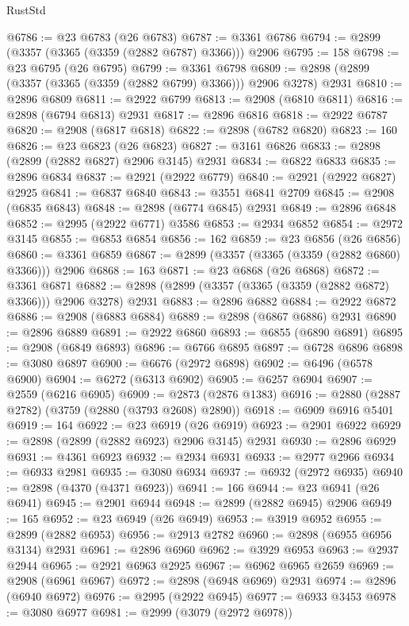 \begin{lexlean}{RustStd}
\begin{coremodule}
@6786 := @23 @6783 (@26 @6783)
@6787 := @3361 @6786
@6794 := @2899 (@3357 (@3365 (@3359 (@2882 @6787) @3366))) @2906
@6795 := 158
@6798 := @23 @6795 (@26 @6795)
@6799 := @3361 @6798
@6809 := @2898 (@2899 (@3357 (@3365 (@3359 (@2882 @6799) @3366))) @2906 @3278) @2931
@6810 := @2896 @6809
@6811 := @2922 @6799
@6813 := @2908 (@6810 @6811)
@6816 := @2898 (@6794 @6813) @2931
@6817 := @2896 @6816
@6818 := @2922 @6787
@6820 := @2908 (@6817 @6818)
@6822 := @2898 (@6782 @6820)
@6823 := 160
@6826 := @23 @6823 (@26 @6823)
@6827 := @3161 @6826
@6833 := @2898 (@2899 (@2882 @6827) @2906 @3145) @2931
@6834 := @6822 @6833
@6835 := @2896 @6834
@6837 := @2921 (@2922 @6779)
@6840 := @2921 (@2922 @6827) @2925
@6841 := @6837 @6840
@6843 := @3551 @6841 @2709
@6845 := @2908 (@6835 @6843)
@6848 := @2898 (@6774 @6845) @2931
@6849 := @2896 @6848
@6852 := @2995 (@2922 @6771) @3586
@6853 := @2934 @6852
@6854 := @2972 @3145
@6855 := @6853 @6854
@6856 := 162
@6859 := @23 @6856 (@26 @6856)
@6860 := @3361 @6859
@6867 := @2899 (@3357 (@3365 (@3359 (@2882 @6860) @3366))) @2906
@6868 := 163
@6871 := @23 @6868 (@26 @6868)
@6872 := @3361 @6871
@6882 := @2898 (@2899 (@3357 (@3365 (@3359 (@2882 @6872) @3366))) @2906 @3278) @2931
@6883 := @2896 @6882
@6884 := @2922 @6872
@6886 := @2908 (@6883 @6884)
@6889 := @2898 (@6867 @6886) @2931
@6890 := @2896 @6889
@6891 := @2922 @6860
@6893 := @6855 (@6890 @6891)
@6895 := @2908 (@6849 @6893)
@6896 := @6766 @6895
@6897 := @6728 @6896
@6898 := @3080 @6897
@6900 := @6676 (@2972 @6898)
@6902 := @6496 (@6578 @6900)
@6904 := @6272 (@6313 @6902)
@6905 := @6257 @6904
@6907 := @2559 (@6216 @6905)
@6909 := @2873 (@2876 @1383)
@6916 := @2880 (@2887 @2782) (@3759 (@2880 (@3793 @2608) @2890))
@6918 := @6909 @6916 @5401
@6919 := 164
@6922 := @23 @6919 (@26 @6919)
@6923 := @2901 @6922
@6929 := @2898 (@2899 (@2882 @6923) @2906 @3145) @2931
@6930 := @2896 @6929
@6931 := @4361 @6923
@6932 := @2934 @6931
@6933 := @2977 @2966
@6934 := @6933 @2981
@6935 := @3080 @6934
@6937 := @6932 (@2972 @6935)
@6940 := @2898 (@4370 (@4371 @6923))
@6941 := 166
@6944 := @23 @6941 (@26 @6941)
@6945 := @2901 @6944
@6948 := @2899 (@2882 @6945) @2906
@6949 := 165
@6952 := @23 @6949 (@26 @6949)
@6953 := @3919 @6952
@6955 := @2899 (@2882 @6953)
@6956 := @2913 @2782
@6960 := @2898 (@6955 @6956 @3134) @2931
@6961 := @2896 @6960
@6962 := @3929 @6953
@6963 := @2937 @2944
@6965 := @2921 @6963 @2925
@6967 := @6962 @6965 @2659
@6969 := @2908 (@6961 @6967)
@6972 := @2898 (@6948 @6969) @2931
@6974 := @2896 (@6940 @6972)
@6976 := @2995 (@2922 @6945)
@6977 := @6933 @3453
@6978 := @3080 @6977
@6981 := @2999 (@3079 (@2972 @6978))

\end{coremodule}
\end{lexlean}
